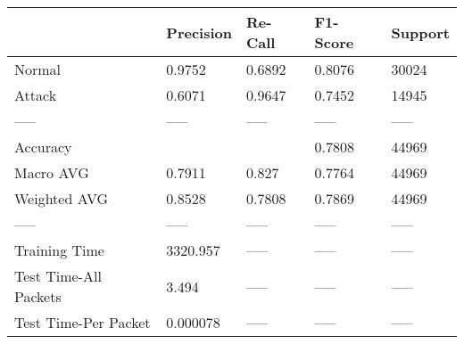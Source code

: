 \begin{tabular}{lllll}
\toprule
{} & Precision & Re-Call & F1-Score & Support \\
\midrule
Normal                &    0.9752 &  0.6892 &   0.8076 &   30024 \\
Attack                &    0.6071 &  0.9647 &   0.7452 &   14945 \\
-----                 &     ----- &   ----- &    ----- &   ----- \\
Accuracy              &           &         &   0.7808 &   44969 \\
Macro AVG             &    0.7911 &   0.827 &   0.7764 &   44969 \\
Weighted AVG          &    0.8528 &  0.7808 &   0.7869 &   44969 \\
-----                 &     ----- &   ----- &    ----- &   ----- \\
Training Time         &  3320.957 &   ----- &    ----- &   ----- \\
Test Time-All Packets &     3.494 &   ----- &    ----- &   ----- \\
Test Time-Per Packet  &  0.000078 &   ----- &    ----- &   ----- \\
\bottomrule
\end{tabular}
